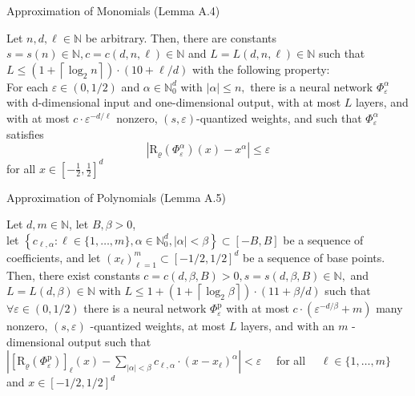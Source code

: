 \documentclass{if-beamer}
\begin{document}
\begin{frame}{Approximation of Monomials (Lemma A.4)}
    \begin{tcolorbox}
        Let $n, d, \ell \in \mathbb{N}$ be arbitrary. Then, there are constants $s=s(n) \in \mathbb{N}, c=c(d, n, \ell) \in \mathbb{N}$ and $L=L(d, n, \ell) \in \mathbb{N}$ such that $L \leq\left(1+\left\lceil\log _{2} n\right\rceil\right) \cdot(10+\ell / d)$ with the following property:\\
        For each $\varepsilon \in(0,1 / 2)$ and $\alpha \in \mathbb{N}_{0}^{d}$ with $|\alpha| \leq n,$ there is a neural network $\Phi_{\varepsilon}^{\alpha}$ with d-dimensional input
        and one-dimensional output, with at most $L$ layers, and with at most $c \cdot \varepsilon^{-d / \ell}$ nonzero, $(s, \varepsilon)$-quantized weights, and such that $\Phi_{\varepsilon}^{\alpha}$ satisfies
        \[
        \left|\mathrm{R}_{\varrho}\left(\Phi_{\varepsilon}^{\alpha}\right)(x)-x^{\alpha}\right| \leq \varepsilon
        \]
        for all $x \in\left[-\frac{1}{2}, \frac{1}{2}\right]^{d}$
    \end{tcolorbox}
\end{frame}

\begin{frame}{Approximation of Polynomials (Lemma A.5)}
    \begin{tcolorbox}
        Let $d, m \in \mathbb{N}$, let $B, \beta>0$,\\ 
        let $\left\{c_{\ell, \alpha}: \ell \in\{1, \ldots, m\}, \alpha \in \mathbb{N}_{0}^{d},|\alpha|<\beta\right\} \subset[-B, B]$ be a
        sequence of coefficients, and let $\left(x_{\ell}\right)_{\ell=1}^{m} \subset[-1 / 2,1 / 2]^{d}$ be a sequence of base points.\\
        Then, there exist constants $c=c(d, \beta, B)>0, s=s(d, \beta, B) \in \mathbb{N},$ and $L=L(d, \beta) \in \mathbb{N}$ with $L \leq 1+\left(1+\left\lceil\log _{2} \beta\right\rceil\right) \cdot(11+\beta / d)$ such that $\forall \varepsilon \in(0,1 / 2)$ there is a neural network $\Phi_{\varepsilon}^{\mathrm{p}}$ with at most $c \cdot\left(\varepsilon^{-d / \beta}+m\right)$ many nonzero, $(s, \varepsilon)$ -quantized weights, at most $L$ layers, and with an $m$ -dimensional output such that
        $\left|\left[\mathrm{R}_{\varrho}\left(\Phi_{\varepsilon}^{\mathrm{p}}\right)\right]_{\ell}(x)-\sum_{|\alpha|<\beta} c_{\ell, \alpha} \cdot\left(x-x_{\ell}\right)^{\alpha}\right|<\varepsilon \quad$ for all $\quad \ell \in\{1, \ldots, m\}$ and $x \in[-1 / 2,1 / 2]^{d}$
    \end{tcolorbox}
\end{frame}
\end{document}
